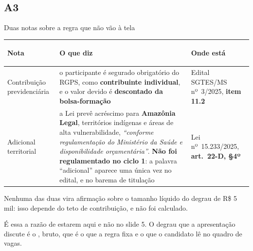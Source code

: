 \documentclass[aspectratio=169,10pt]{beamer}
\begin{document}
\subsection{A3}

\begin{frame}{Duas notas sobre a regra que não vão à tela}
  \vspace{0.2em}
  {\scriptsize\renewcommand{\arraystretch}{1.15}
  \begin{tabularx}{\textwidth}{@{}>{\bfseries\raggedright\arraybackslash}p{} L >{\raggedright\arraybackslash}p{0.21\textwidth}@{}}
    \toprule
    \normalfont\bfseries Nota & \bfseries O que diz & \bfseries Onde está \\
    \midrule
    Contribuição previdenciária & o participante é segurado obrigatório do
      RGPS, como \textbf{contribuinte individual}, e o valor devido é
      \textbf{descontado da bolsa-formação} &
      Edital SGTES/MS nº~3/2025, \textbf{item 11.2} \\
    \addlinespace[0.25em]
    Adicional territorial & a Lei prevê acréscimo para \textbf{Amazônia
      Legal}, territórios indígenas e áreas de alta vulnerabilidade,
      \textit{``conforme regulamentação do Ministério da Saúde e
      disponibilidade orçamentária''}. \textbf{Não foi regulamentado no ciclo
      1}: a palavra ``adicional'' aparece uma única vez no edital, e no barema
      de titulação &
      Lei nº~15.233/2025, \textbf{art.~22-D, §4º} \\
    \bottomrule
  \end{tabularx}}

  \vspace{0.35em}
  \begin{destaque}[0.96\textwidth]
    \scriptsize Nenhuma das duas vira afirmação sobre o tamanho líquido do
    degrau de R\$ 5 mil: isso depende do teto de contribuição, e não foi
    calculado.
  \end{destaque}

  \vspace{0.25em}
  {\scriptsize É essa a razão de estarem aqui e não no slide 5. O degrau que a
  apresentação discute é o , bruto, que é o que a regra fixa e
  o que o candidato lê no quadro de vagas.}

\end{frame}
\end{document}
